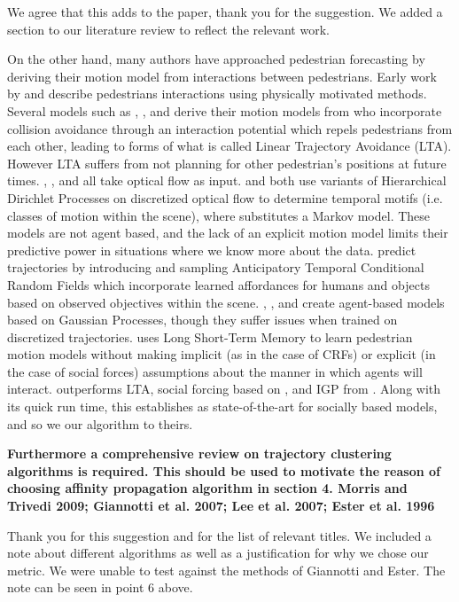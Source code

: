 \documentclass[usenames,dvipsnames]{article}
\providecommand{\response}[1]{
\noindent
\noindent\colorbox{gray!20}{
\parbox{\textwidth}{
\setlength{\parskip}{.1in}
\setlength{\parindent}{.1in}
#1}
}
}
\begin{document}
\begin{enumerate}
We agree that this adds to the paper, thank you for the suggestion. We added a section to our literature review to reflect the relevant work.

\reversemarginpar{}
	\response{On the other hand, many authors have approached pedestrian forecasting by deriving their motion model from interactions between pedestrians. Early work by \cite{Helbing1995} and \cite{Xu2012} describe pedestrians interactions using physically motivated methods. Several models such as \cite{Yamaguchi2011}, \cite{Yi2016}, and \cite{Pellegrini2009} derive their motion models from \cite{Helbing1995} who incorporate collision avoidance through an interaction potential which repels pedestrians from each other, leading to forms of what is called Linear Trajectory Avoidance (LTA). However LTA suffers from not planning for other pedestrian’s positions at future times. \cite{Emonet2011}, \cite{Hospedales2009} , and \cite{Wang2009}  all take optical flow as input. \cite{Wang2009} and \cite{Emonet2011} both use variants of Hierarchical Dirichlet Processes on discretized optical flow to determine temporal motifs (i.e. classes of motion within the scene), where \cite{Hospedales2009} substitutes a Markov model. These models are not agent based, and the lack of an explicit motion model limits their predictive power in situations where we know more about the data. \cite{Koppula2016} predict trajectories by introducing and sampling Anticipatory Temporal Conditional Random Fields which incorporate learned affordances for humans and objects based on observed objectives within the scene. \cite{Tay2008} , \cite{Wang2008}, and \cite{Trautman2015} create agent-based models based on Gaussian Processes, though they suffer issues when trained on discretized trajectories. \cite{Alahi2016} uses Long Short-Term Memory to learn pedestrian motion models without making implicit (as in the case of CRFs) or explicit (in the case of social forces) assumptions about the manner in which agents will interact. \cite{Alahi2016} outperforms LTA, social forcing based on \cite{Yamaguchi2011},  and IGP from \cite{Trautman2015}. Along with its quick run time, this establishes \cite{Alahi2016} as state-of-the-art for socially based models, and so we our algorithm to theirs. }

\begin{item}
\textbf{Furthermore a comprehensive review on trajectory clustering algorithms
is required. This should be used to motivate the reason of choosing
affinity propagation algorithm in section 4. 
Morris and Trivedi 2009; Giannotti et al. 2007; Lee et al. 2007;
Ester et al. 1996 }

Thank you for this suggestion and for the list of relevant titles. We included a note about different algorithms as well as a justification for why we chose our metric. We were unable to test against the methods of Giannotti and Ester. The note can be seen in point 6 above. 

\end{item}
\end{enumerate}
\end{document}
